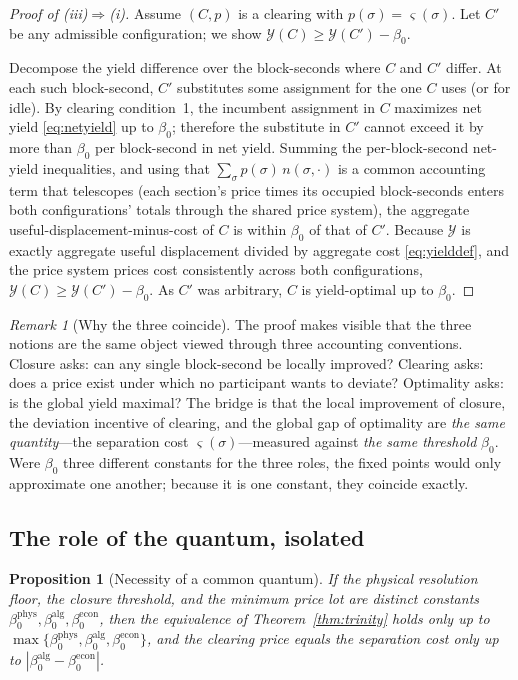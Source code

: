 \documentclass[11pt,twocolumn,a4paper]{article}
\newtheorem{proposition}[theorem]{Proposition}
\theoremstyle{definition}
\theoremstyle{remark}
\newtheorem{remark}[theorem]{Remark}
\newcommand{\yield}{\mathcal{Y}}
\newcommand{\blocktime}{\beta_0}
\newcommand{\sep}{\varsigma}
\begin{document}
\begin{proof}[Proof of \textup{(iii)}$\Rightarrow$\textup{(i)}]
Assume $(C,p)$ is a clearing with $p(\sigma)=\sep(\sigma)$. Let $C'$ be any admissible configuration; we show $\yield(C)\ge\yield(C')-\blocktime$.

Decompose the yield difference over the block-seconds where $C$ and $C'$ differ. At each such block-second, $C'$ substitutes some assignment for the one $C$ uses (or for idle). By clearing condition~1, the incumbent assignment in $C$ maximizes net yield \eqref{eq:netyield} up to $\blocktime$; therefore the substitute in $C'$ cannot exceed it by more than $\blocktime$ per block-second in net yield. Summing the per-block-second net-yield inequalities, and using that $\sum_\sigma p(\sigma)\,n(\sigma,\cdot)$ is a common accounting term that telescopes (each section's price times its occupied block-seconds enters both configurations' totals through the shared price system), the aggregate useful-displacement-minus-cost of $C$ is within $\blocktime$ of that of $C'$. Because $\yield$ is exactly aggregate useful displacement divided by aggregate cost \eqref{eq:yielddef}, and the price system prices cost consistently across both configurations, $\yield(C)\ge\yield(C')-\blocktime$. As $C'$ was arbitrary, $C$ is yield-optimal up to $\blocktime$.
\end{proof}

\begin{remark}[Why the three coincide]
The proof makes visible that the three notions are the same object viewed through three accounting conventions. Closure asks: can any single block-second be locally improved? Clearing asks: does a price exist under which no participant wants to deviate? Optimality asks: is the global yield maximal? The bridge is that the local improvement of closure, the deviation incentive of clearing, and the global gap of optimality are \emph{the same quantity}---the separation cost $\sep(\sigma)$---measured against \emph{the same threshold} $\blocktime$. Were $\blocktime$ three different constants for the three roles, the fixed points would only approximate one another; because it is one constant, they coincide exactly.
\end{remark}

\subsection{The role of the quantum, isolated}

\begin{proposition}[Necessity of a common quantum]
\label{prop:quantum}
If the physical resolution floor, the closure threshold, and the minimum price lot are distinct constants $\blocktime^{\mathrm{phys}},\blocktime^{\mathrm{alg}},\blocktime^{\mathrm{econ}}$, then the equivalence of Theorem~\ref{thm:trinity} holds only up to $\max\{\blocktime^{\mathrm{phys}},\blocktime^{\mathrm{alg}},\blocktime^{\mathrm{econ}}\}$, and the clearing price equals the separation cost only up to $|\blocktime^{\mathrm{alg}}-\blocktime^{\mathrm{econ}}|$.
\end{proposition}
\end{document}
